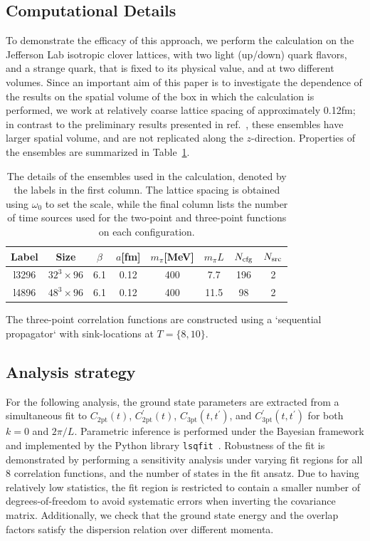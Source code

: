 \documentclass[prd,aps,twocolumn,superscriptaddress,tightenlines,nofootinbib,floatfix,preprintnumbers,10pt]{revtex4-1}
\begin{document}
\subsection{Computational Details}
To demonstrate the efficacy of this approach, we perform the
calculation on the Jefferson Lab isotropic clover lattices, with two light
(up/down) quark flavors, and a strange quark, that is fixed to its
physical value, and at two different volumes.  Since an important aim
of this paper is to investigate the dependence of the results on the
spatial volume of the box in which the calculation is performed, we
work at relatively coarse lattice spacing of approximately 0.12fm; in contrast to the
preliminary results presented in ref.~\cite{Bouchard:2016gmc}, these
ensembles have larger spatial volume, and are not replicated along the $z$-direction.  Properties of the ensembles are summarized in Table~\ref{tab:cfg}.
\begin{table}
  \begin{tabular}{cccccccc}
  	\hline\hline
    Label & Size & $\beta$ & $a$[fm] & $m_\pi$[MeV] & $m_\pi L$ & $N_{\rm cfg}$ & $N_{\rm src}$\\
    \hline
    l3296 & $32^3 \times 96$ & 6.1 & 0.12 & 400 & 7.7 & 196 & 2\\
    l4896 & $48^3 \times 96$ & 6.1 & 0.12 & 400 & 11.5 & 98 & 2\\
    \hline\hline
  \end{tabular}
  \caption{The details of the ensembles used in the calculation, denoted by the labels in the first column.  The
    lattice spacing is obtained using $\omega_0$ to set the scale,
    while the final column lists the number of time sources used for
    the two-point and three-point functions on each
    configuration.\label{tab:cfg}}
\end{table}


The three-point correlation functions are constructed using a `sequential propagator` with sink-locations at $T=\{8,10\}$.

\subsection{Analysis strategy}
For the following analysis, the ground state parameters are extracted from a simultaneous fit to $C_{\mathrm{2pt}}(t)$, $C^\prime_{\mathrm{2pt}}(t)$, $C_{\mathrm{3pt}}(t,t^\prime)$, and $C^\prime_{\mathrm{3pt}}(t,t^\prime)$ for both $k=0$ and $2\pi/L$. Parametric inference is performed under the Bayesian framework and implemented by the Python library \texttt{lsqfit}~\cite{lsqfit-9.3}. Robustness of the fit is demonstrated by performing a sensitivity analysis under varying fit regions for all 8 correlation functions, and the number of states in the fit ansatz. Due to having relatively low statistics, the fit region is restricted to contain a smaller number of degrees-of-freedom to avoid systematic errors when inverting the covariance matrix. Additionally, we check that the ground state energy and the overlap factors satisfy the dispersion relation over different momenta.
\end{document}
